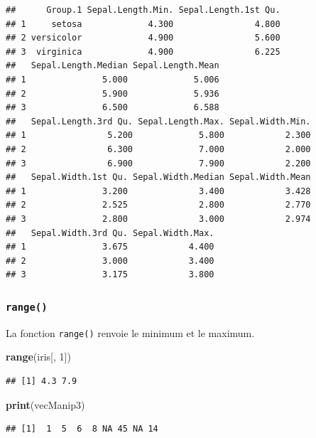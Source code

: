 \documentclass[twoside,symmetric]{book}
\newenvironment{Shaded}{}{}
\newcommand{\DecValTok}[1]{#1}
\newcommand{\KeywordTok}[1]{\textbf{#1}}
\newcommand{\NormalTok}[1]{#1}
\begin{document}
\begin{verbatim}
##      Group.1 Sepal.Length.Min. Sepal.Length.1st Qu.
## 1     setosa             4.300                4.800
## 2 versicolor             4.900                5.600
## 3  virginica             4.900                6.225
##   Sepal.Length.Median Sepal.Length.Mean
## 1               5.000             5.006
## 2               5.900             5.936
## 3               6.500             6.588
##   Sepal.Length.3rd Qu. Sepal.Length.Max. Sepal.Width.Min.
## 1                5.200             5.800            2.300
## 2                6.300             7.000            2.000
## 3                6.900             7.900            2.200
##   Sepal.Width.1st Qu. Sepal.Width.Median Sepal.Width.Mean
## 1               3.200              3.400            3.428
## 2               2.525              2.800            2.770
## 3               2.800              3.000            2.974
##   Sepal.Width.3rd Qu. Sepal.Width.Max.
## 1               3.675            4.400
## 2               3.000            3.400
## 3               3.175            3.800
\end{verbatim}

\hypertarget{l015range}{%
\subsubsection{\texorpdfstring{\texttt{range()}}{range()}}\label{l015range}}

La fonction \texttt{range()} renvoie le minimum et le maximum.

\begin{Shaded}
\begin{Highlighting}[]
\KeywordTok{range}\NormalTok{(iris[, }\DecValTok{1}\NormalTok{])}
\end{Highlighting}
\end{Shaded}

\begin{verbatim}
## [1] 4.3 7.9
\end{verbatim}

\begin{Shaded}
\begin{Highlighting}[]
\KeywordTok{print}\NormalTok{(vecManip3)}
\end{Highlighting}
\end{Shaded}

\begin{verbatim}
## [1]  1  5  6  8 NA 45 NA 14
\end{verbatim}
\end{document}
